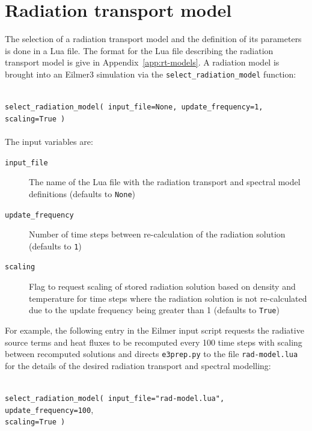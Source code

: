 \section{Radiation transport model}
\label{radiation-transport-sec}
%
The selection of a radiation transport model and the definition of its parameters
is done in a Lua file.
The format for the Lua file describing the radiation transport model is give in Appendix~\ref{app:rt-models}.
A radiation model is brought into an Eilmer3 simulation via the \texttt{select\_radiation\_model} function:

\noindent\topbar\\
\texttt{select\_radiation\_model( input\_file=None, update\_frequency=1, scaling=True )} 
 \\
\bottombar\\

The input variables are:

\begin{description}
 \item[ \texttt{input\_file}] The name of the Lua file with the radiation transport and spectral model definitions (defaults to \texttt{None})
 \item[\texttt{update\_frequency}] Number of time steps between re-calculation of the radiation solution (defaults to \texttt{1})
  \item[\texttt{scaling}] Flag to request scaling of stored radiation solution based on density and temperature for time steps where the radiation solution is not re-calculated due to the update frequency being greater than 1 (defaults to \texttt{True})
\end{description}
 

For example, the following entry in the Eilmer input script requests the radiative source terms and heat fluxes
 to be recomputed every 100 time steps with scaling between recomputed solutions and directs \texttt{e3prep.py} to the file \texttt{rad-model.lua} 
 for the details of the desired radiation transport and spectral modelling:

\noindent\topbar\\
\texttt{select\_radiation\_model( input\_file="rad-model.lua", update\_frequency=100},\\
 \texttt{scaling=True )} 
 \\
\bottombar\\

